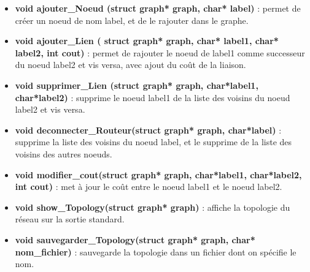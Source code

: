 \begin{itemize}
\item \textbf{void ajouter\_Noeud (struct graph* graph, char* label)} : permet de créer un noeud de nom label, et de le rajouter dans le graphe.

\item \textbf{void ajouter\_Lien ( struct graph* graph, char* label1, char* label2, int cout)} : permet de rajouter le noeud de label1 comme successeur du noeud label2 et vis versa, avec ajout du coût de la liaison. 

\item  \textbf{void supprimer\_Lien (struct graph* graph, char*label1, char*label2)} : supprime le noeud label1 de la liste des voisins du noeud label2 et vis versa.
 
\item \textbf{void deconnecter\_Routeur(struct graph* graph, char*label)} : supprime la liste des voisins du noeud label, et le supprime de la liste des voisins des autres noeuds.

\item \textbf{void modifier\_cout(struct graph* graph, char*label1, char*label2, int cout)} : met à jour le coût entre le noeud label1 et le noeud label2.
\item \textbf{void show\_Topology(struct graph* graph)} : affiche la topologie du réseau sur la sortie standard. 
\item \textbf{void sauvegarder\_Topology(struct graph* graph, char* nom\_fichier)} : sauvegarde la topologie dans un fichier dont on spécifie le nom.
\end{itemize}

